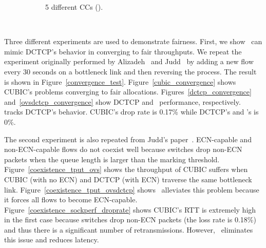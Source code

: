 \begin{figure}[!t]
\begin{subfigure}[b]{0.45\textwidth}
                \caption{5 different CCs (\acdc{}).}
                \label{fairness_5CC_with_ours}
        \end{subfigure}
	\caption{~} 
 	\label{tput_fairness_coexistence}
\end{figure}	


Three different experiments are used to demonstrate fairness. First, we show~\acdc{} can mimic DCTCP's 
behavior in converging to fair throughputs. We repeat the experiment originally performed 
by Alizadeh~\cite{dctcp} and Judd~\cite{judd2015nsdi} by 
adding a new flow every 30 seconds on a bottleneck link and then reversing the process. 
The result is shown in Figure~\ref{convergence_test}.
Figure~\ref{cubic_convergence} shows CUBIC's problems converging to fair allocations.
Figures~\ref{dctcp_convergence}
and~\ref{ovsdctcp_convergence} show DCTCP and~\acdc{} performance, respectively.~\acdc{} tracks DCTCP's behavior.
CUBIC's drop rate is 0.17\% while DCTCP's and \acdc{}'s is 0\%. 

The second experiment is also repeated from Judd's paper~\cite{judd2015nsdi}. 
ECN-capable and non-ECN-capable flows do not coexist well because switches
drop non-ECN packets when the queue length is larger than the marking threshold. Figure~\ref{coexistence_tput_ovs}
shows the throughput of CUBIC suffers when CUBIC (with no ECN) and DCTCP (with ECN) traverse the same bottleneck link.
Figure~\ref{coexistence_tput_ovsdctcp} shows~\acdc{} alleviates this problem 
because it forces all flows to become ECN-capable.
Figure~\ref{coexistence_sockperf_droprate} shows CUBIC's RTT is extremely high
in the first case because switches drop non-ECN packets (the loss rate is 0.18\%) and thus
there is a significant number of retransmissions. However,~\acdc{} eliminates 
this issue and reduces latency.

